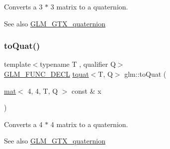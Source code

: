 Converts a 3 $\ast$ 3 matrix to a quaternion.

\begin{DoxySeeAlso}{See also}
\mbox{\hyperlink{group__gtx__quaternion}{G\+L\+M\+\_\+\+G\+T\+X\+\_\+quaternion}} 
\end{DoxySeeAlso}
\mbox{\label{group__gtx__quaternion_ga6c0a178ac9c7d23e1a6848045d83aa54}} 
\subsubsection{\texorpdfstring{to\+Quat()}{toQuat()}\hspace{0.1cm}{\footnotesize\ttfamily [2/2]}}
{\footnotesize\ttfamily template$<$typename T , qualifier Q$>$ \\
\mbox{\hyperlink{setup_8hpp_ab2d052de21a70539923e9bcbf6e83a51}{G\+L\+M\+\_\+\+F\+U\+N\+C\+\_\+\+D\+E\+CL}} \mbox{\hyperlink{structglm_1_1tquat}{tquat}}$<$T, Q$>$ glm\+::to\+Quat (\begin{DoxyParamCaption}\item[{\mbox{\hyperlink{structglm_1_1mat}{mat}}$<$ 4, 4, T, Q $>$ const \&}]{x }\end{DoxyParamCaption})}

Converts a 4 $\ast$ 4 matrix to a quaternion.

\begin{DoxySeeAlso}{See also}
\mbox{\hyperlink{group__gtx__quaternion}{G\+L\+M\+\_\+\+G\+T\+X\+\_\+quaternion}} 
\end{DoxySeeAlso}
